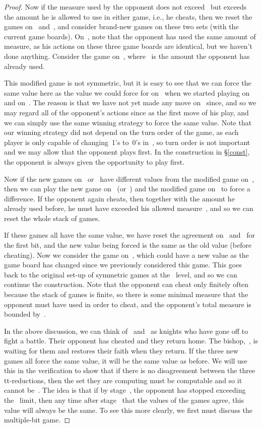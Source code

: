\documentclass{LMCS}
\newcommand{\0}{\mathbf{0}}
\newcommand{\<}{\langle}
\renewcommand{\>}{\rangle}
\begin{document}
\begin{proof}
Now if the measure used by the opponent does not exceed~ but
exceeds the amount he is allowed to use in either game, i.e., he cheats, then
we reset the games on~ and~, and consider brand-new games
 on these two sets (with the current game boards).
On~, note that the opponent has used the same amount of measure, as his
actions on these three game boards are identical, but we haven't done
anything.  Consider the game  on~,
where~ is the amount the opponent has already used.

This modified game is not symmetric, but it is easy to see that we can force
the same value here as the value we could force for
 on~ when we started playing
 on~ and  on~. The reason
is that we have not yet made any move on~ since, and so we may regard
all of the opponent's actions since as the first move of his play, and we can
simply use the same winning strategy to force the same value. Note that our
winning strategy did not depend on the turn order of the game, as each player
is only capable of changing~1's to~0's in~, so turn order is not
important and we may allow that the opponent plays first. In the construction
in \S\ref{const}, the opponent is always given the opportunity to play first.

Now if the new games  on~ or~ have
different values from the modified game on~, then we can play the new
game on~ (or~) and the modified game on~ to force a
difference. If the opponent again cheats, then together with the amount he
already used before, he must have exceeded his allowed measure~,
and so we can reset the whole stack of games.

If these games all have the same value, we have reset the agreement on~
and~ for the first bit, and the new value being forced is the same as
the old value (before cheating). Now we consider the game
 on~, which could have a new value as the game
board has changed since we previously considered this game. This goes back to
the original set-up of symmetric games at the~ level, and so we
can continue the construction.  Note that the opponent can cheat only
finitely often because the stack of games is finite, so there is some minimal
measure  that the opponent must have used in order to
cheat, and the opponent's total measure is bounded by~.

In the above discussion, we can think of~ and~ as knights who have
gone off to fight a battle.  Their opponent has cheated and they return home.
The bishop,~, is waiting for them and restores their faith when they
return.  If the three new games  all force the same
value, it will be the same value as before.  We will use this in the
verification to show that if there is no disagreement between the three
tt-reductions, then the set they are computing must be computable and so it
cannot be~.  The idea is that if by stage~, the opponent has stopped
exceeding the~ limit, then any time after stage~ that the
values of the games  agree, this value will always
be the same.  To see this more clearly, we first must discuss the
multiple-bit game.


\end{proof}
\end{document}
